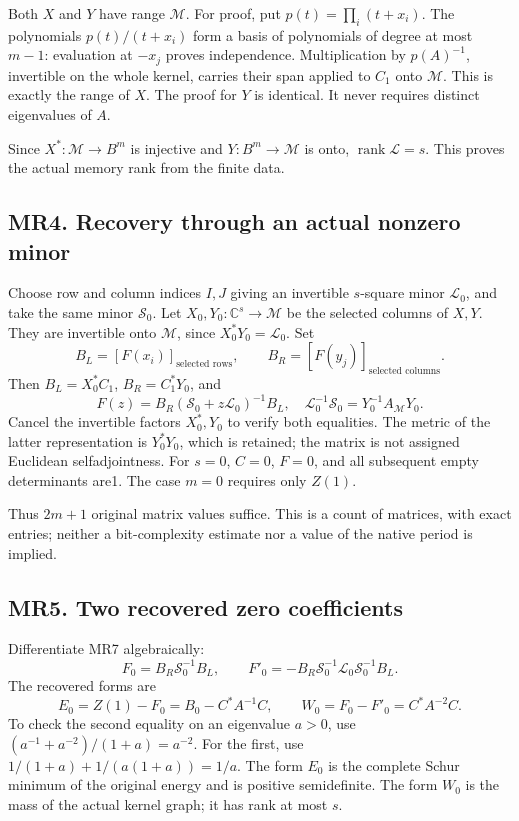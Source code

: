 \documentclass[11pt]{article}
\begin{document}
Both \(X\) and \(Y\) have range \(\mathcal M\). For proof, put \(p(t)=\prod_i(t+x_i)\). The polynomials \(p(t)/(t+x_i)\) form a basis of polynomials of degree at most \(m-1\): evaluation at \(-x_j\) proves independence. Multiplication by \(p(A)^{-1}\), invertible on the whole kernel, carries their span applied to \(C_1\) onto \(\mathcal M\). This is exactly the range of \(X\). The proof for \(Y\) is identical. It never requires distinct eigenvalues of \(A\).

Since \(X^*:\mathcal M\to B^m\) is injective and \(Y:B^m\to\mathcal M\) is onto, \(\operatorname{rank}\mathcal L=s\). This proves the actual memory rank from the finite data.

\subsection{MR4. Recovery through an actual nonzero minor}\label{mr4.-recovery-through-an-actual-nonzero-minor}

Choose row and column indices \(I,J\) giving an invertible \(s\)-square minor \(\mathcal L_0\), and take the same minor \(\mathcal S_0\). Let \(X_0,Y_0:\mathbb C^s\to\mathcal M\) be the selected columns of \(X,Y\). They are invertible onto \(\mathcal M\), since \(X_0^*Y_0=\mathcal L_0\). Set \[
 B_L=[F(x_i)]_{\text{selected rows}},\qquad
 B_R=[F(y_j)]_{\text{selected columns}}.
\] Then \(B_L=X_0^*C_1\), \(B_R=C_1^*Y_0\), and \[
 F(z)=B_R(\mathcal S_0+z\mathcal L_0)^{-1}B_L,\quad
 \mathcal L_0^{-1}\mathcal S_0=Y_0^{-1}A_{\mathcal M}Y_0 .
\tag{MR7}
\] Cancel the invertible factors \(X_0^*,Y_0\) to verify both equalities. The metric of the latter representation is \(Y_0^*Y_0\), which is retained; the matrix is not assigned Euclidean selfadjointness. For \(s=0\), \(C=0\), \(F=0\), and all subsequent empty determinants are1. The case \(m=0\) requires only \(Z(1)\).

Thus \(2m+1\) original matrix values suffice. This is a count of matrices, with exact entries; neither a bit-complexity estimate nor a value of the native period is implied.

\subsection{MR5. Two recovered zero coefficients}\label{mr5.-two-recovered-zero-coefficients}

Differentiate MR7 algebraically: \[
 F_0=B_R\mathcal S_0^{-1}B_L,\qquad
 F'_0=-B_R\mathcal S_0^{-1}\mathcal L_0\mathcal S_0^{-1}B_L.
\] The recovered forms are \[
 E_0=Z(1)-F_0=B_0-C^*A^{-1}C,\qquad
 W_0=F_0-F'_0=C^*A^{-2}C.
\tag{MR8}
\] To check the second equality on an eigenvalue \(a>0\), use \((a^{-1}+a^{-2})/(1+a)=a^{-2}\). For the first, use \(1/(1+a)+1/(a(1+a))=1/a\). The form \(E_0\) is the complete Schur minimum of the original energy and is positive semidefinite. The form \(W_0\) is the mass of the actual kernel graph; it has rank at most \(s\).
\end{document}

